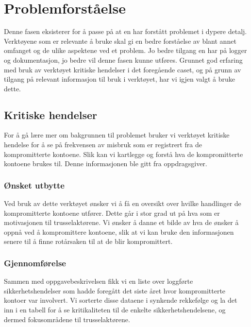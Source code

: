 \chapter{Problemforståelse}
Denne fasen eksisterer for å passe på at en har forstått problemet i dypere detalj. Verktøyene som er relevante å bruke skal gi en bedre forståelse av blant annet omfanget og de ulike aspektene ved et problem. Jo bedre tilgang en har på logger og dokumentasjon, jo bedre vil denne fasen kunne utføres. Grunnet god erfaring med bruk av verktøyet kritiske hendelser i det foregående caset, og på grunn av tilgang på relevant informasjon til bruk i verktøyet, har vi igjen valgt å bruke dette. 


\section{Kritiske hendelser}
For å gå lære mer om bakgrunnen til problemet bruker vi verktøyet kritiske hendelse for å se på frekvensen av misbruk som er registrert fra de kompromitterte kontoene. Slik kan vi kartlegge og forstå hva de kompromitterte kontoene brukes til. Denne informasjonen ble gitt fra oppdragsgiver.

\subsection{Ønsket utbytte}
Ved bruk av dette verktøyet ønsker vi å få en oversikt over hvilke handlinger de kompromitterte kontoene utfører. Dette går i stor grad ut på hva som er motivasjonen til trusselaktørene. Vi ønsker å danne et bilde av hva de ønsker å oppnå ved å kompromittere kontoene, slik at vi kan bruke den informasjonen senere til å finne rotårsaken til at de blir kompromittert. 

\subsection{Gjennomførelse}
Sammen med oppgavebeskrivelsen fikk vi en liste over loggførte sikkerhetshendelser som hadde foregått det siste året hvor kompromitterte kontoer var involvert. Vi sorterte disse dataene i synkende rekkefølge og la det inn i en tabell for å se kritikaliteten til de enkelte sikkerhetshendelsene, og dermed fokusområdene til trusselaktørene. 

